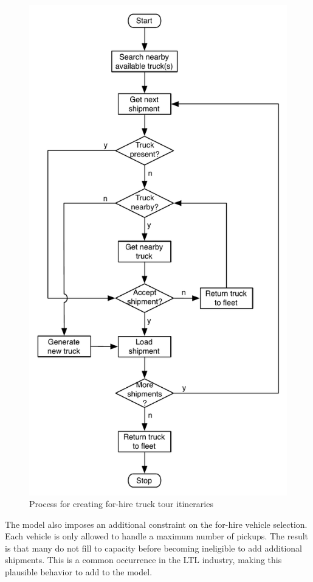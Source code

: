 \begin{figure}[!b]
\centering
\includegraphics[scale=0.7]{figures/ForHireTrucks}
\caption{Process for creating for-hire truck tour itineraries}
\label{fig:ct-forhire-tour-formation}
\end{figure}

The model also imposes an additional constraint on the for-hire vehicle selection. Each vehicle is only allowed to handle a maximum number of pickups. The result is that many do not fill to capacity before becoming ineligible to add additional shipments. This is a common occurrence in the LTL industry, making this plausible behavior to add to the model.

